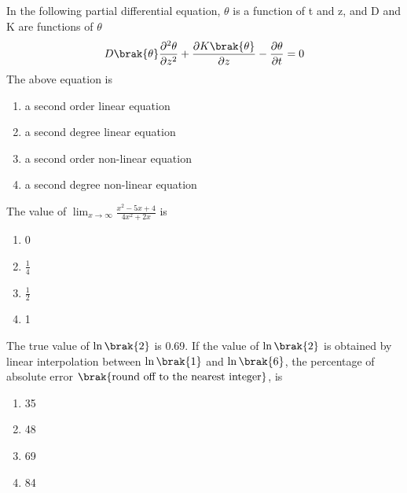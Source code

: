 \item In the following partial differential equation, $\theta$ is a function of t and z, and D and K are functions of $\theta$ \\
	\begin{align*}
		D\brak{\theta}\frac{\partial^2\theta}{\partial z^2} + \frac{\partial K\brak{\theta}}{\partial z} - \frac{\partial \theta}{\partial t} = 0
	\end{align*}
	The above equation is
	\begin{enumerate}
                \item a second order linear equation
                \item a second degree linear equation
                \item a second order non-linear equation
                \item a second degree non-linear equation
        \end{enumerate}
\item The value of $\lim_{x \to \infty}{\frac{x^2 - 5x + 4}{4x^2 + 2x}}$ is
	\begin{enumerate}    
                \item 0
		\item $\frac{1}{4}$
		\item $\frac{1}{2}$
                \item 1
        \end{enumerate}
\item The true value of $\ln{\brak{2}}$ is 0.69. If the value of $\ln{\brak{2}}$ is obtained by linear interpolation between $\ln{\brak{1}}$ and $\ln{\brak{6}}$, the percentage of absolute error $\brak{\text{round off to the nearest integer}}$, is
	\begin{enumerate}                                                                              
                \item 35     
                \item 48                 
                \item 69                  
                \item 84                                 
        \end{enumerate}

